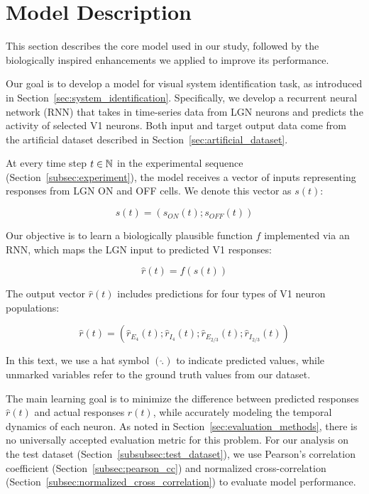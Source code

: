 \section{Model Description}
\label{sec:model_description}

This section describes the core model used in our study, followed by the biologically inspired enhancements we applied to improve its performance.

Our goal is to develop a model for visual system identification task, as introduced in Section~\ref{sec:system_identification}. Specifically, we develop a recurrent neural network (RNN) that takes in time-series data from LGN neurons and predicts the activity of selected V1 neurons. Both input and target output data come from the artificial dataset described in Section~\ref{sec:artificial_dataset}.

At every time step $t \in \mathbb{N}$ in the experimental sequence (Section~\ref{subsec:experiment}), the model receives a vector of inputs representing responses from LGN ON and OFF cells. We denote this vector as $s(t)$:

\begin{equation*}
    s(t) = \left(s_{ON}(t); s_{OFF}(t)\right)
\end{equation*}

Our objective is to learn a biologically plausible function $f$ implemented via an RNN, which maps the LGN input to predicted V1 responses:

\begin{equation*}
    \hat{r}(t) = f(s(t))
\end{equation*}

The output vector $\hat{r}(t)$ includes predictions for four types of V1 neuron populations:

\begin{equation*}
    \hat{r}(t) = \left(\hat{r}_{E_4}(t); \hat{r}_{I_4}(t); \hat{r}_{E_{2/3}}(t); \hat{r}_{I_{2/3}}(t)\right)
\end{equation*}

In this text, we use a hat symbol $(\hat{.})$ to indicate predicted values, while unmarked variables refer to the ground truth values from our dataset.

The main learning goal is to minimize the difference between predicted responses $\hat{r}(t)$ and actual responses $r(t)$, while accurately modeling the temporal dynamics of each neuron. As noted in Section~\ref{sec:evaluation_methods}, there is no universally accepted evaluation metric for this problem. For our analysis on the test dataset (Section~\ref{subsubsec:test_dataset}), we use Pearson's correlation coefficient (Section~\ref{subsec:pearson_cc}) and normalized cross-correlation (Section~\ref{subsec:normalized_cross_correlation}) to evaluate model performance.

